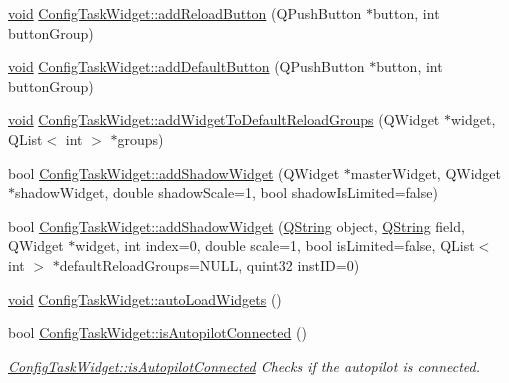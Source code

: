 \begin{DoxyCompactItemize}
\item 
\hyperlink{group___u_a_v_objects_plugin_ga444cf2ff3f0ecbe028adce838d373f5c}{void} \hyperlink{group___u_a_v_object_widget_utils_ga08a7e3f2686fdb1ef91db0843cb9414e}{\-Config\-Task\-Widget\-::add\-Reload\-Button} (\-Q\-Push\-Button $\ast$button, int button\-Group)
\item 
\hyperlink{group___u_a_v_objects_plugin_ga444cf2ff3f0ecbe028adce838d373f5c}{void} \hyperlink{group___u_a_v_object_widget_utils_gac0e04866c45a89a3f2c6f3241afa86d3}{\-Config\-Task\-Widget\-::add\-Default\-Button} (\-Q\-Push\-Button $\ast$button, int button\-Group)
\item 
\hyperlink{group___u_a_v_objects_plugin_ga444cf2ff3f0ecbe028adce838d373f5c}{void} \hyperlink{group___u_a_v_object_widget_utils_gabdd18a22aae23df220d48868ecbdf3a0}{\-Config\-Task\-Widget\-::add\-Widget\-To\-Default\-Reload\-Groups} (\-Q\-Widget $\ast$widget, \-Q\-List$<$ int $>$ $\ast$groups)
\item 
bool \hyperlink{group___u_a_v_object_widget_utils_ga726f8720d2d1bb52d38a6425fbfab448}{\-Config\-Task\-Widget\-::add\-Shadow\-Widget} (\-Q\-Widget $\ast$master\-Widget, \-Q\-Widget $\ast$shadow\-Widget, double shadow\-Scale=1, bool shadow\-Is\-Limited=false)
\item 
bool \hyperlink{group___u_a_v_object_widget_utils_ga285c7e48c6b730133169c0226cbc59c4}{\-Config\-Task\-Widget\-::add\-Shadow\-Widget} (\hyperlink{group___u_a_v_objects_plugin_gab9d252f49c333c94a72f97ce3105a32d}{\-Q\-String} object, \hyperlink{group___u_a_v_objects_plugin_gab9d252f49c333c94a72f97ce3105a32d}{\-Q\-String} field, \-Q\-Widget $\ast$widget, int index=0, double scale=1, bool is\-Limited=false, \-Q\-List$<$ int $>$ $\ast$default\-Reload\-Groups=\-N\-U\-L\-L, quint32 inst\-I\-D=0)
\item 
\hyperlink{group___u_a_v_objects_plugin_ga444cf2ff3f0ecbe028adce838d373f5c}{void} \hyperlink{group___u_a_v_object_widget_utils_ga945551d9d4d280fe2cd14bc2646d8fbf}{\-Config\-Task\-Widget\-::auto\-Load\-Widgets} ()
\item 
bool \hyperlink{group___u_a_v_object_widget_utils_gad61b70a01e85822c5838c2c5833c22fd}{\-Config\-Task\-Widget\-::is\-Autopilot\-Connected} ()
\begin{DoxyCompactList}\small\item\em \hyperlink{group___u_a_v_object_widget_utils_gad61b70a01e85822c5838c2c5833c22fd}{\-Config\-Task\-Widget\-::is\-Autopilot\-Connected} \-Checks if the autopilot is connected. \end{DoxyCompactList}\item 

\end{DoxyCompactItemize}
